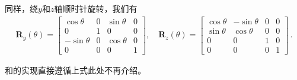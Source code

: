 同样，绕$y$和$z$轴顺时针旋转，我们有
\begin{align*}
    \bm R_y(\theta)=\left[
        \begin{array}{cccc}
            \cos\theta  & 0 & \sin\theta & 0 \\
            0           & 1 & 0          & 0 \\
            -\sin\theta & 0 & \cos\theta & 0 \\
            0           & 0 & 0          & 1
        \end{array}
        \right], \quad
    \bm R_z(\theta)=\left[
        \begin{array}{cccc}
            \cos\theta & -\sin\theta & 0 & 0 \\
            \sin\theta & \cos\theta  & 0 & 0 \\
            0          & 0           & 1 & 0 \\
            0          & 0           & 0 & 1
        \end{array}
        \right]\, .
\end{align*}

和的实现直接遵循上式此处不再介绍。